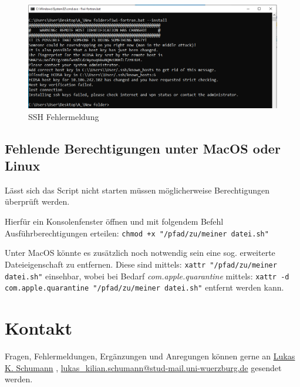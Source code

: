 \documentclass[11pt, a4paper]{article}
\begin{document}
\begin{figure}[h]
    \centering
    \includegraphics[width=0.9\linewidth]{./pics/2022-03-16_16-04.png}
    \caption{SSH Fehlermeldung}
    \label{fig:ssh-host-key}
\end{figure}


\subsection{Fehlende Berechtigungen unter MacOS oder Linux}
Lässt sich das Script nicht starten müssen möglicherweise Berechtigungen überprüft werden.

Hierfür ein Konsolenfenster öffnen und mit folgendem Befehl Ausführberechtigungen erteilen: \newline\texttt{chmod +x "/pfad/zu/meiner datei.sh"}

Unter MacOS könnte es zusätzlich noch notwendig sein eine sog. erweiterte Dateieigenschaft zu entfernen.
Diese sind mittels:
\newline\texttt{xattr "/pfad/zu/meiner datei.sh"}
\newline einsehbar, wobei bei Bedarf \emph{com.apple.quarantine} mittels:
\newline\texttt{xattr -d com.apple.quarantine "/pfad/zu/meiner datei.sh"}
\newline entfernt werden kann.


\section{Kontakt}

Fragen, Fehlermeldungen, Ergänzungen und Anregungen können gerne an
\newline\underline{\href{mailto:lukas\_kilian.schumann@stud-mail.uni-wuerzburg.de}{Lukas K. Schumann}}
, {\href{mailto:lukas\_kilian.schumann@stud-mail.uni-wuerzburg.de}{lukas\_kilian.schumann@stud-mail.uni-wuerzburg.de}} gesendet werden.
\end{document}
